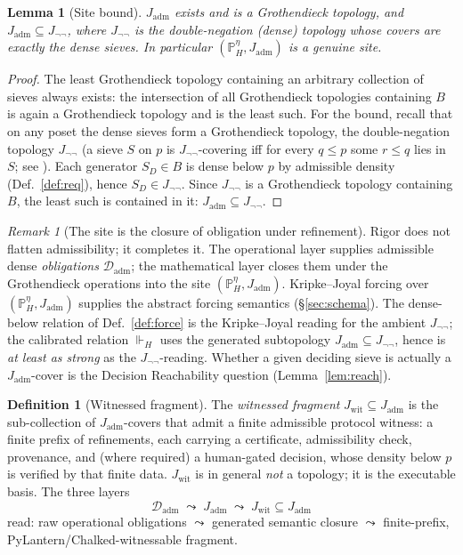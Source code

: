 \documentclass[11pt]{article}
\newtheorem{lemma}{Lemma}
\theoremstyle{definition}
\newtheorem{definition}{Definition}
\theoremstyle{remark}
\newtheorem*{remark}{Remark}
\newcommand{\forcesH}{\Vdash_{H}}
\newcommand{\PHeta}{\mathbb{P}_{H}^{\eta}}
\newcommand{\refines}{\leq}
\newcommand{\Dadm}{\mathcal{D}_{\mathrm{adm}}}
\newcommand{\Jadm}{J_{\mathrm{adm}}}
\newcommand{\Jwit}{J_{\mathrm{wit}}}
\newcommand{\Jnn}{J_{\neg\neg}}
\begin{document}
\begin{lemma}[Site bound]\label{lem:sitebound}
$\Jadm$ exists and is a Grothendieck topology, and $\Jadm\subseteq\Jnn$, where $\Jnn$ is the
double-negation (dense) topology whose covers are exactly the dense sieves. In particular
$(\PHeta,\Jadm)$ is a genuine site.
\end{lemma}

\begin{proof}
The least Grothendieck topology containing an arbitrary collection of sieves always exists: the
intersection of all Grothendieck topologies containing $B$ is again a Grothendieck topology and is
the least such. For the bound, recall that on any poset the dense sieves form a Grothendieck topology,
the double-negation topology $\Jnn$ (a sieve $S$ on $p$ is $\Jnn$-covering iff for every $q\refines p$
some $r\refines q$ lies in $S$; see \cite{maclane-moerdijk}). Each generator $S_D\in B$ is dense below
$p$ by admissible density (Def.~\ref{def:req}), hence $S_D\in\Jnn$. Since $\Jnn$ is a Grothendieck
topology containing $B$, the least such is contained in it: $\Jadm\subseteq\Jnn$.
\end{proof}

\begin{remark}[The site is the closure of obligation under refinement]
Rigor does not flatten admissibility; it completes it. The operational layer supplies admissible
dense \emph{obligations} $\Dadm$; the mathematical layer closes them under the Grothendieck operations
into the site $(\PHeta,\Jadm)$. Kripke--Joyal forcing over $(\PHeta,\Jadm)$ supplies the abstract
forcing semantics (\S\ref{sec:schema}). The dense-below relation of Def.~\ref{def:force} is the
Kripke--Joyal reading for the ambient $\Jnn$; the calibrated relation $\forcesH$ uses the generated
subtopology $\Jadm\subseteq\Jnn$, hence is \emph{at least as strong} as the $\Jnn$-reading. Whether a
given deciding sieve is actually a $\Jadm$-cover is the Decision Reachability question
(Lemma~\ref{lem:reach}).
\end{remark}

\begin{definition}[Witnessed fragment]\label{def:wit}
The \emph{witnessed fragment} $\Jwit\subseteq\Jadm$ is the sub-collection of $\Jadm$-covers that admit
a finite admissible protocol witness: a finite prefix of refinements, each carrying a certificate,
admissibility check, provenance, and (where required) a human-gated decision, whose density below $p$
is verified by that finite data. $\Jwit$ is in general \emph{not} a topology; it is the executable
basis. The three layers
\[
  \Dadm \;\leadsto\; \Jadm \;\leadsto\; \Jwit\subseteq\Jadm
\]
read: raw operational obligations $\leadsto$ generated semantic closure $\leadsto$ finite-prefix,
PyLantern/Chalked-witnessable fragment.
\end{definition}
\end{document}
